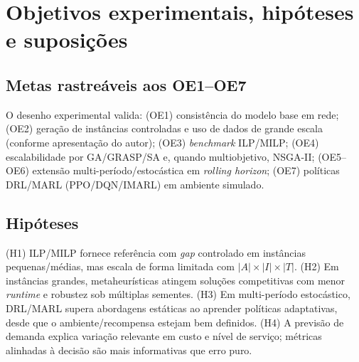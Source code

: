 

\section{Objetivos experimentais, hipóteses e suposições}
\subsection*{Metas rastreáveis aos OE1--OE7}
O desenho experimental valida: (OE1) consistência do modelo base em rede; (OE2) geração de instâncias controladas e uso de dados de grande escala (conforme apresentação do autor); (OE3) \emph{benchmark} ILP/MILP; (OE4) escalabilidade por GA/GRASP/SA e, quando multiobjetivo, NSGA-II; (OE5--OE6) extensão multi-período/estocástica em \emph{rolling horizon}; (OE7) políticas DRL/MARL (PPO/DQN/IMARL) em ambiente simulado.

\subsection*{Hipóteses}
(H1) ILP/MILP fornece referência com \emph{gap} controlado em instâncias pequenas/médias, mas escala de forma limitada com \(|A|\times|I|\times|T|\). \cite{Shapiro2001ModelingSupplyChain}
(H2) Em instâncias grandes, metaheurísticas atingem soluções competitivas com menor \emph{runtime} e robustez sob múltiplas sementes. \cite{Talbi2009Metaheuristics}
(H3) Em multi-período estocástico, DRL/MARL supera abordagens estáticas ao aprender políticas adaptativas, desde que o ambiente/recompensa estejam bem definidos. \cite{Boute2022DRLInventoryRoadmap,Geevers2024MEIODRL,Ziegner2025IMARL}
(H4) A previsão de demanda explica variação relevante em custo e nível de serviço; métricas alinhadas à decisão são mais informativas que erro puro. \cite{Nasseri2023RetailDemandPrediction,TadayonradNdiaye2023KPIDemandForecasting}

